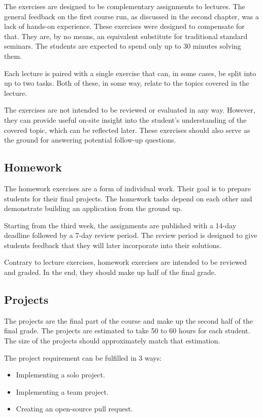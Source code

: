 \documentclass[
  digital,
  color,
  oneside,
  nosansbold,
  nocolorbold,
  lof,
  lot,
]{fithesis4}
\begin{document}
The exercises are designed to be complementary assignments to lectures. The general feedback on the first course run, as discussed in the second chapter, was a lack of hands-on experience. These exercises were designed to compensate for that. They are, by no means, an equivalent substitute for traditional standard seminars. The students are expected to spend only up to 30 minutes solving them.

Each lecture is paired with a single exercise that can, in some cases, be split into up to two tasks. Both of these, in some way, relate to the topics covered in the lecture.

The exercises are not intended to be reviewed or evaluated in any way. However, they can provide useful on-site insight into the student's understanding of the covered topic, which can be reflected later. These exercises should also serve as the ground for answering potential follow-up questions.

\subsection{Homework}

The homework exercises are a form of individual work. Their goal is to prepare students for their final projects. The homework tasks depend on each other and demonstrate building an application from the ground up.

Starting from the third week, the assignments are published with a 14-day deadline followed by a 7-day review period. The review period is designed to give students feedback that they will later incorporate into their solutions.

Contrary to lecture exercises, homework exercises are intended to be reviewed and graded. In the end, they should make up half of the final grade.

\subsection{Projects}

The projects are the final part of the course and make up the second half of the final grade. The projects are estimated to take 50 to 60 hours for each student. The size of the projects should approximately match that estimation.

The project requirement can be fulfilled in 3 ways:
\begin{itemize}
 \item Implementing a solo project.
 \item Implementing a team project.
 \item Creating an open-source pull request.
\end{itemize}
\end{document}
